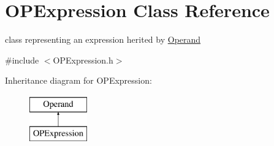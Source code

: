 \hypertarget{class_o_p_expression}{}\section{O\+P\+Expression Class Reference}
\label{class_o_p_expression}


class representing an expression herited by \mbox{\hyperlink{class_operand}{Operand}}  




{\ttfamily \#include $<$O\+P\+Expression.\+h$>$}

Inheritance diagram for O\+P\+Expression\+:\begin{figure}[H]
\begin{center}
\leavevmode
\includegraphics[height=2.000000cm]{class_o_p_expression}
\end{center}
\end{figure}
